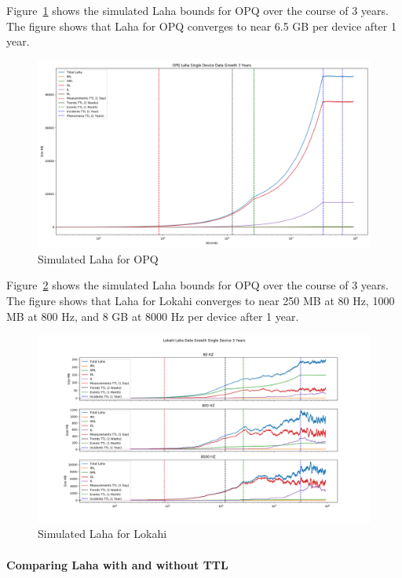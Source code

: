 Figure~\ref{fig:sim_laha_opq} shows the simulated Laha bounds for OPQ over the course of 3 years. The figure shows that Laha for OPQ converges to near 6.5 GB per device after 1 year.

\begin{figure}[H]
	\centering
	\includegraphics[width=\linewidth]{figures/sim_laha_opq.png}
	\caption{Simulated Laha for OPQ}
	\label{fig:sim_laha_opq}
\end{figure}

Figure~\ref{fig:sim_laha_lokahi} shows the simulated Laha bounds for OPQ over the course of 3 years. The figure shows that Laha for Lokahi converges to near 250 MB at 80 Hz, 1000 MB at 800 Hz, and 8 GB at 8000 Hz per device after 1 year.

\begin{figure}[H]
	\centering
	\includegraphics[width=\linewidth]{figures/sim_laha_lokahi.png}
	\caption{Simulated Laha for Lokahi}
	\label{fig:sim_laha_lokahi}
\end{figure}


\paragraph{Comparing Laha with and without TTL}

